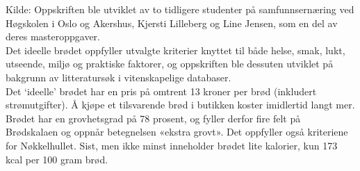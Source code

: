 Kilde: Oppskriften ble utviklet av to tidligere studenter på samfunnsernæring ved Høgskolen i Oslo og Akershus, Kjersti Lilleberg og Line Jensen, som en del av deres masteroppgaver.\\

Det ideelle brødet oppfyller utvalgte kriterier knyttet til både helse, smak, lukt, utseende, miljø og praktiske faktorer, og oppskriften ble dessuten utviklet på bakgrunn av litteratursøk i vitenskapelige databaser.\\

Det `ideelle' brødet har en pris på omtrent 13 kroner per brød (inkludert strømutgifter). Å kjøpe et tilsvarende brød i butikken koster imidlertid langt mer.\\

Brødet har en grovhetsgrad på 78 prosent, og fyller derfor fire felt på Brødskalaen og oppnår betegnelsen «ekstra grovt». Det oppfyller også kriteriene for Nøkkelhullet. Sist, men ikke minst inneholder brødet lite kalorier, kun 173 kcal per 100 gram brød.\\
